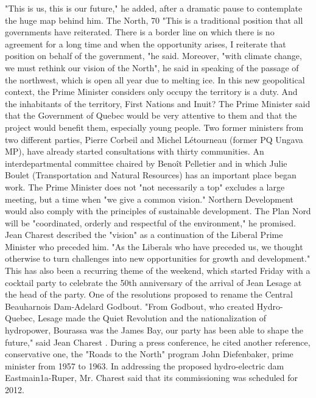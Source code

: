 "This is us, this is our future," he added, after a dramatic pause to contemplate the huge map behind him.
The North, 70%
"This is a traditional position that all governments have reiterated.
There is a border line on which there is no agreement for a long time and when the opportunity arises, I reiterate that position on behalf of the government, "he said.
Moreover, "with climate change, we must rethink our vision of the North", he said in speaking of the passage of the northwest, which is open all year due to melting ice.
In this new geopolitical context, the Prime Minister considers only occupy the territory is a duty.
And the inhabitants of the territory, First Nations and Inuit?
The Prime Minister said that the Government of Quebec would be very attentive to them and that the project would benefit them, especially young people.
Two former ministers from two different parties, Pierre Corbeil and Michel Létourneau (former PQ Ungava MP), have already started consultations with thirty communities.
An interdepartmental committee chaired by Benoît Pelletier and in which Julie Boulet (Transportation and Natural Resources) has an important place began work.
The Prime Minister does not "not necessarily a top" excludes a large meeting, but a time when "we give a common vision."
Northern Development would also comply with the principles of sustainable development.
The Plan Nord will be "coordinated, orderly and respectful of the environment," he promised.
Jean Charest described the "vision" as a continuation of the Liberal Prime Minister who preceded him.
"As the Liberals who have preceded us, we thought otherwise to turn challenges into new opportunities for growth and development."
This has also been a recurring theme of the weekend, which started Friday with a cocktail party to celebrate the 50th anniversary of the arrival of Jean Lesage at the head of the party.
One of the resolutions proposed to rename the Central Beauharnois Dam-Adelard Godbout.
"From Godbout, who created Hydro-Quebec, Lesage made the Quiet Revolution and the nationalization of hydropower, Bourassa was the James Bay, our party has been able to shape the future," said Jean Charest .
During a press conference, he cited another reference, conservative one, the "Roads to the North" program John Diefenbaker, prime minister from 1957 to 1963.
In addressing the proposed hydro-electric dam Eastmain1a-Ruper, Mr. Charest said that its commissioning was scheduled for 2012.
